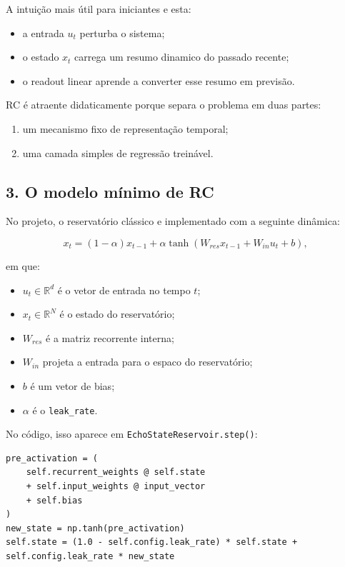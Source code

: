 \documentclass[12pt]{article}
\providecommand{\tightlist}{%
  \setlength{\itemsep}{0pt}\setlength{\parskip}{0pt}}
\begin{document}
A intuição mais útil para iniciantes e esta:

\begin{itemize}
\tightlist
\item
  a entrada \(u_t\) perturba o sistema;
\item
  o estado \(x_t\) carrega um resumo dinamico do passado recente;
\item
  o readout linear aprende a converter esse resumo em previsão.
\end{itemize}

RC é atraente didaticamente porque separa o problema em duas partes:

\begin{enumerate}
\def\labelenumi{\arabic{enumi}.}
\tightlist
\item
  um mecanismo fixo de representação temporal;
\item
  uma camada simples de regressão treinável.
\end{enumerate}

\subsection{3. O modelo mínimo de RC}\label{3-o-modelo-muxednimo-de-rc}

No projeto, o reservatório clássico e implementado com a seguinte dinâmica:

\[
x_t = (1 - \alpha) x_{t-1} + \alpha \tanh(W_{res} x_{t-1} + W_{in} u_t + b),
\]

em que:

\begin{itemize}
\tightlist
\item
  \(u_t \in \mathbb{R}^d\) é o vetor de entrada no tempo \(t\);
\item
  \(x_t \in \mathbb{R}^N\) é o estado do reservatório;
\item
  \(W_{res}\) é a matriz recorrente interna;
\item
  \(W_{in}\) projeta a entrada para o espaco do reservatório;
\item
  \(b\) é um vetor de bias;
\item
  \(\alpha\) é o \texttt{leak\_rate}.
\end{itemize}

No código, isso aparece em \texttt{EchoStateReservoir.step()}:

\begin{verbatim}
pre_activation = (
    self.recurrent_weights @ self.state
    + self.input_weights @ input_vector
    + self.bias
)
new_state = np.tanh(pre_activation)
self.state = (1.0 - self.config.leak_rate) * self.state + self.config.leak_rate * new_state
\end{verbatim}
\end{document}
